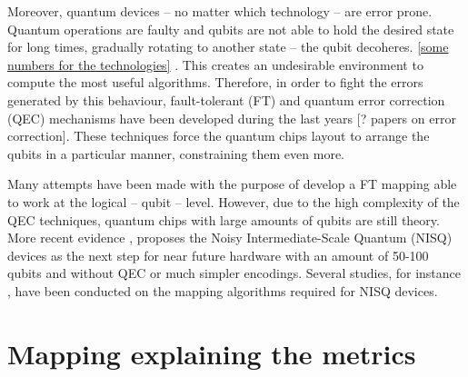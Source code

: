Moreover, quantum devices -- no matter which technology -- are error prone.
Quantum operations are faulty and qubits are not able to hold the desired state for long times, gradually rotating to another state -- the qubit decoheres.
\uline{[some numbers for the technologies]} \cite{O_Brien_2017}.
This creates an undesirable environment to compute the most useful algorithms.
Therefore, in order to fight the errors generated by this behaviour, fault-tolerant (FT) and quantum error correction (QEC) mechanisms have been developed during the last years \cite{Nielsen_2009} [? papers on error correction].
These techniques force the quantum chips layout to arrange the qubits in a particular manner, constraining them even more.

Many attempts have been made \cite{Dousti_2014,Heckey_2015,hwang18:hierar_system_mappin_large_scale,murphy18:contr,Lao_2018} with the purpose of develop a FT mapping able to work at the logical -- qubit -- level.
However, due to the high complexity of the QEC techniques, quantum chips with large amounts of qubits are still theory.
More recent evidence \cite{Preskill_2018}, proposes the Noisy Intermediate-Scale Quantum (NISQ) devices as the next step for near future hardware with an amount of 50-100 qubits and without QEC or much simpler encodings.
Several studies, for instance \cite{tannu18:case_variab_aware_polic_nisq,paler18:nisq,paler18:influen_initial_qubit_placem_durin}, have been conducted on the mapping algorithms required for NISQ devices.
\section*{Mapping explaining the metrics}
\label{sec:org3410d92}
